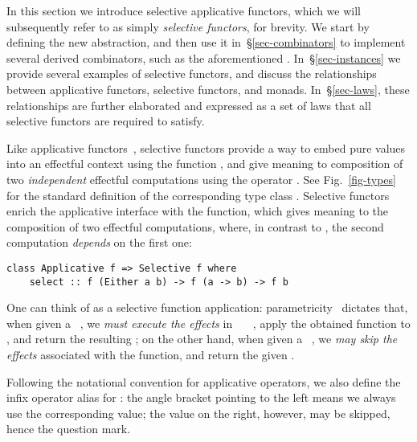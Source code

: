 
In this section we introduce selective applicative functors, which we will
subsequently refer to as simply \emph{selective functors}, for brevity. We start
by defining the new abstraction, and then use it in~\S\ref{sec-combinators} to
implement several derived combinators, such as the aforementioned .
In~\S\ref{sec-instances} we provide several examples of selective functors, and
discuss the relationships between applicative functors, selective functors, and
monads. In~\S\ref{sec-laws}, these relationships are further elaborated and
expressed as a set of laws that all selective functors are required to satisfy.

Like applicative functors~\citep{mcbride2008applicative}, selective functors
provide a way to embed pure values into an effectful context  using the
function , and give meaning to composition of two \emph{independent}
effectful computations using the operator \hs{<*>}. See Fig.~\ref{fig-types} for
the standard definition of the corresponding type class .
Selective functors enrich the applicative interface with the 
function, which gives meaning to the composition of two effectful computations,
where, in contrast to \hs{<*>}, the second computation \emph{depends} on the
first one:

\vspace{1mm}
\begin{verbatim}
class Applicative f => Selective f where
    select :: f (Either a b) -> f (a -> b) -> f b
\end{verbatim}
\vspace{1mm}

\noindent
One can think of  as a selective function application:
parametricity~\citep{wadler1989theorems} dictates that, when given a
~, we \emph{must execute the effects} in
~\hs{(}~\hs{->}~, apply the obtained function to , and
return the resulting ; on the other hand, when given a ~,
we \emph{may skip the effects} associated with the function, and return the
given .

Following the notational convention for applicative operators, we also define
the infix operator alias  for : the angle bracket pointing to
the left means we always use the corresponding value; the value on the right,
however, may be skipped, hence the question mark.

